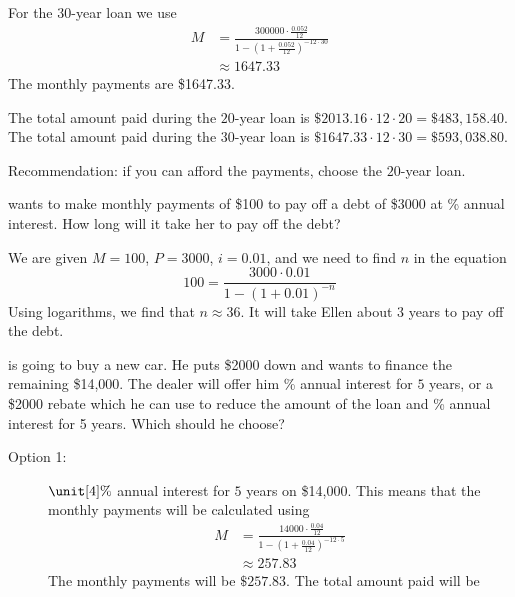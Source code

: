 \begin{problem}
\begin{subproblem}
\begin{shortsolution}
			 For the $30$-year loan we use
			 \begin{align*}
				 M & = \frac{300000\cdot \frac{0.052}{12}}{1-\left( 1+\frac{0.052}{12} \right)^{-12\cdot 30}} \\
				   & \approx 1647.33
			 \end{align*}
			 The monthly payments are \$1647.33.

			 The total amount paid during the $20$-year loan is $\$2013.16\cdot 12\cdot 20=\$483,158.40$.
			 The total amount paid during the $30$-year loan is $\$1647.33\cdot 12\cdot 30=\$593,038.80$.

			 Recommendation: if you can afford the payments, choose the $20$-year loan.
		 \end{shortsolution}
	 \end{subproblem}
	 \begin{subproblem}
		  wants to make monthly payments of \$100 to pay off a debt of \$3000
		 at \unit[12]{\%} annual interest. How long will it take her to pay off the
		 debt?
		 \begin{shortsolution}
			 We are given $M=100$, $P=3000$, $i=0.01$, and we need to find $n$
			 in the equation
			 \[
				 100 = \frac{3000\cdot 0.01}{1-(1+0.01)^{-n}}
			 \]
			 Using logarithms, we find that $n\approx 36$. It will take
			 Ellen about $3$ years to pay off the debt.
		 \end{shortsolution}
	 \end{subproblem}
	 \begin{subproblem}
		  is going to buy a new car. He puts \$2000 down and wants to finance the
		 remaining \$14,000. The dealer will offer him \unit[4]{\%} annual interest for
		 $5$ years, or a \$2000
		 rebate which he can use to reduce the amount of the loan and \unit[8]{\%}
		 annual interest for 5 years. Which should he choose?
		 \begin{shortsolution}
			 \begin{description}
				 \item[Option 1:] $\unit[4]{\%}$ annual interest for $5$ years on \$14,000.
				       This means that the monthly payments will be calculated using
				       \begin{align*}
					       M & = \frac{14000\cdot \frac{0.04}{12}}{1-\left( 1+\frac{0.04}{12} \right)^{-12\cdot 5}} \\
					         & \approx 257.83
				       \end{align*}
				       The monthly payments will be $\$257.83$. The total amount paid will be

\end{description}
\end{shortsolution}
\end{subproblem}
\end{problem}
